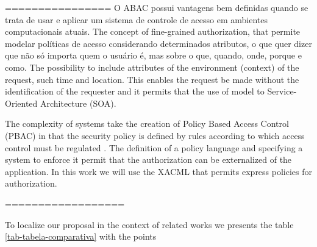 ================
O ABAC possui vantagens bem definidas quando se trata de usar e aplicar um sistema de controle de acesso em ambientes computacionais atuais. The concept of fine-grained authorization, that permite modelar políticas de acesso considerando determinados atributos, o que quer dizer que não só importa quem o usuário é, mas sobre o que, quando, onde, porque e como. The possibility to include attributes of the environment (context) of the request, such time and location. This enables the request be made without the identification of the requester and it permits that the use of model to Service-Oriented Architecture (SOA).

The complexity of systems take the creation of Policy Based Access Control (PBAC) in that the security policy is defined by rules according to which access control must be regulated \citep{samarati2001access}. The definition of a policy language and specifying a system to enforce it permit that the authorization can be externalized of the application. In this work we will use the XACML that permits express policies for authorization.


==================

To localize our proposal in the context of related works we presents the table \ref{tab-tabela-comparativa} with the points 

